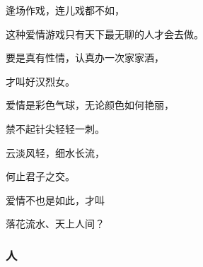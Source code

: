 \par 
\par 逢场作戏，连儿戏都不如，
\par 这种爱情游戏只有天下最无聊的人才会去做。
\par 要是真有性情，认真办一次家家酒，
\par 才叫好汉烈女。
\par 
\par 爱情是彩色气球，无论颜色如何艳丽，
\par 禁不起针尖轻轻一刺。
\par 
\par 云淡风轻，细水长流，
\par 何止君子之交。
\par 爱情不也是如此，才叫
\par 落花流水、天上人间？



\subsubsection{人}

